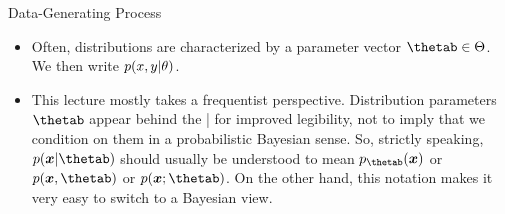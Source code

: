 \begin{vbframe}{Data-Generating Process}
\begin{itemize}
  \item Often, distributions are characterized by a parameter vector 
  $\thetab \in \Theta$. We then write $p(x, y | \theta)$.
  
  \item This lecture mostly takes a frequentist perspective. Distribution 
  parameters $\thetab$ appear behind the | for improved legibility, not to imply 
  that we condition on them in a probabilistic Bayesian sense.
  So, strictly speaking, $p(\xv | \thetab)$ should usually be understood to mean 
  $p_{\thetab}(\xv)$ or $p(\xv, \thetab)$ or $p(\xv; \thetab)$.
  On the other hand, this notation makes it very easy to switch to a Bayesian view.

\end{itemize}

\end{vbframe}


\endlecture

